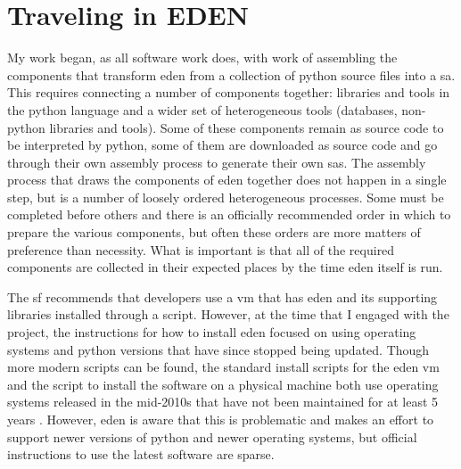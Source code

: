 \documentclass[a4paper,man,natbib,floatsintext]{apa6}
\begin{document}
  \section{Traveling in EDEN}
   My work began, as all software work does, with work of assembling the components that transform \acrshort{eden} from a collection of \gls{python} source files into a \gls{sa}. This requires connecting a number of components together: libraries and tools in the \Gls{python} language and a wider set of heterogeneous tools (databases, non-\gls{python} libraries and tools). Some of these components remain as source code to be interpreted by \gls{python}, some of them are downloaded as source code and go through their own assembly process to generate their own \glspl{sa}. The assembly process that draws the components of \acrshort{eden} together does not happen in a single step, but is a number of loosely ordered heterogeneous processes. Some must be completed before others and there is an officially recommended order in which to prepare the various components, but often these orders are more matters of preference than necessity. What is important is that all of the required components are collected in their expected places by the time \acrshort{eden} itself is run. 

   The \gls{sf} recommends that developers use a \gls{vm} that has \acrshort{eden} and its supporting libraries installed through a script. However, at the time that I engaged with the project, the instructions for how to install \acrshort{eden} focused on using operating systems and \gls{python} versions that have since stopped being updated. Though more modern scripts can be found, the standard install scripts for the \acrshort{eden} \gls{vm} and the script to install the software on a physical machine both use operating systems released in the mid-2010s that have not been maintained for at least 5 years \citep{Canonical2020-ru}. However, \acrshort{eden} is aware that this is problematic and makes an effort to support newer versions of \gls{python} and newer operating systems, but official instructions to use the latest software are sparse.

\end{document}
